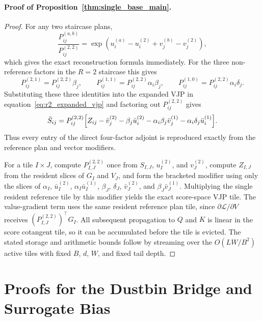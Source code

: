 \paragraph{Proof of Proposition~\ref{thm:single_base_main}.}
\begin{proof}
For any two staircase plans,
\[
\frac{P_{ij}^{(a,b)}}{P_{ij}^{(2,2)}}
=
\exp(u_i^{(a)}-u_i^{(2)}+v_j^{(b)}-v_j^{(2)}),
\]
which gives the exact reconstruction formula immediately. For the three non-reference factors in the $R=2$ staircase this gives
\[
P^{(2,1)}_{ij}=P^{(2,2)}_{ij}\beta_j,
\qquad
P^{(1,1)}_{ij}=P^{(2,2)}_{ij}\alpha_i\beta_j,
\qquad
P^{(1,0)}_{ij}=P^{(2,2)}_{ij}\alpha_i\delta_j.
\]
Substituting these three identities into the expanded VJP in equation~\eqref{eq:r2_expanded_vjp} and factoring out $P^{(2,2)}_{ij}$ gives
\[
\bar S_{ij}
=
P^{(2,2)}_{ij}
\Bigl[
Z_{ij}
-\bar v^{(2)}_j
-\beta_j\bar u^{(2)}_i
-\alpha_i\beta_j\bar v^{(1)}_j
-\alpha_i\delta_j\bar u^{(1)}_i
\Bigr].
\]
Thus every entry of the direct four-factor adjoint is reproduced exactly from the reference plan and vector modifiers.

For a tile $I\times J$, compute $P^{(2,2)}_{I,J}$ once from $S_{I,J}$, $u_I^{(2)}$, and $v_J^{(2)}$, compute $Z_{I,J}$ from the resident slices of $G_I$ and $V_J$, and form the bracketed modifier using only the slices of $\alpha_I$, $\bar u_I^{(2)}$, $\alpha_I\bar u_I^{(1)}$, $\beta_J$, $\delta_J$, $\bar v_J^{(2)}$, and $\beta_J\bar v_J^{(1)}$. Multiplying the single resident reference tile by this modifier yields the exact score-space VJP tile. The value-gradient term uses the same resident reference plan tile, since $\partial\mathcal L/\partial V$ receives $(P^{(2,2)}_{I,J})^\top G_I$. All subsequent propagation to $Q$ and $K$ is linear in the score cotangent tile, so it can be accumulated before the tile is evicted. The stated storage and arithmetic bounds follow by streaming over the $O(LW/B^2)$ active tiles with fixed $B$, $d$, $W$, and fixed tail depth.
\end{proof}

\section{Proofs for the Dustbin Bridge and Surrogate Bias}
\label{app:bias}

